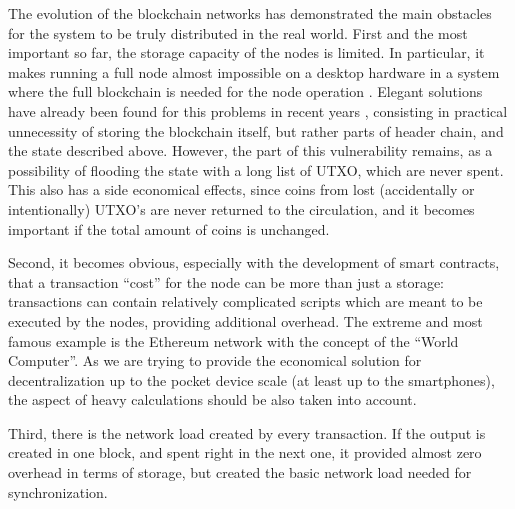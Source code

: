 \documentclass[]{llncs}   %
\newcommand{\authnote}[2]{\marginpar{\parbox{\marginparwidth}{\tiny %
  \textsf{#1 {\textcolor{blue}{notes: #2}}}}}%
  \textcolor{blue}{\textbf{\dag}}}
\newcommand{\authnote}[2]{
  \textsf{#1\textcolor{blue}{ #2}}}
\newcommand{\authnote}[2]{}
\newcommand{\vk}[1]{{\authnote{\textcolor{red}{V:}}{#1}}}
\begin{document}
The evolution of the blockchain networks has demonstrated the main obstacles for
the system to be truly distributed in the real world. First and the most
important so far, the storage capacity of the nodes is limited. In particular, it
makes running a full node almost impossible on a desktop hardware in a system 
where the full blockchain is needed for the node operation \vk{more details}.
Elegant solutions have already been found for this problems in recent years
\vk{citations}, consisting in practical unnecessity of storing the blockchain
itself, but rather parts of header chain, and the state described above.
However, the part of this vulnerability remains, as a possibility of flooding
the state with a long list of UTXO, which are never spent. This also has a side
economical effects, since coins from lost (accidentally or intentionally) UTXO's
are never returned to the circulation, and it becomes important if the total
amount of coins is unchanged.

Second, it becomes obvious, especially with the development of smart contracts,
that a transaction ``cost'' for the node can be more than just a storage:
transactions can contain relatively complicated scripts which are meant to be
executed by the nodes, providing additional overhead. The extreme and most
famous example is the Ethereum network with the concept of the ``World
Computer''. As we are trying to provide the economical solution for
decentralization up to the pocket device scale (at least up to the smartphones),
the aspect of heavy calculations should be also taken into account.

Third, there is the network load created by every transaction. If
the output is created in one block, and spent right in the next one, it provided
almost zero overhead in terms of storage, but created the basic network load
needed for synchronization.
\end{document}
